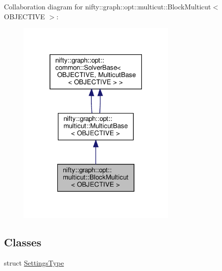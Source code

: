 Collaboration diagram for nifty\+:\+:graph\+:\+:opt\+:\+:multicut\+:\+:Block\+Multicut$<$ O\+B\+J\+E\+C\+T\+I\+VE $>$\+:
\nopagebreak
\begin{figure}[H]
\begin{center}
\leavevmode
\includegraphics[width=219pt]{classnifty_1_1graph_1_1opt_1_1multicut_1_1BlockMulticut__coll__graph}
\end{center}
\end{figure}
\subsection*{Classes}
\begin{DoxyCompactItemize}
\item 
struct \hyperlink{structnifty_1_1graph_1_1opt_1_1multicut_1_1BlockMulticut_1_1SettingsType}{Settings\+Type}
\end{DoxyCompactItemize}
